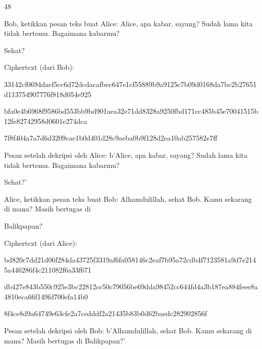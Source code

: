 \documentclass{article}
\begin{document}

48

Bob, ketikkan pesan teks buat Alice:  Alice, apa kabar, sayang? Sudah lama kita tidak bertemu. Bagaimana kabarmu? 

Sehat?

Ciphertext (dari Bob): 

33142cf0694daef5cc6d72dcdacafbec647e1cf55889b9a9125c7b09d0168da7bc2b27651d113754907776f818d054e925

bfa0e4b6968f9586bd553bb9bd901aea32e71dd8328a9250fbd171ec485b45e70041515b12fe82742958d0601e274dca

7f8f404a7a7d6d3209cae1b0d401d28c9aeba0b9f128d2ea10ab257582e7ff

Pesan setelah dekripsi oleh Alice: b'Alice, apa kabar, sayang? Sudah lama kita tidak bertemu. Bagaimana kabarmu? 

Sehat?'

Alice, ketikkan pesan teks buat Bob:  Alhamdulillah, sehat Bob. Kamu sekarang di mana? Masih bertugas di 

Balikpapan?

Ciphertext (dari Alice): 

bd820c7dd21d06f284da43725f3319af6fa058146c2eaf7b95a72cdb4f7123581a9d7e2145a446286f4c211082f6a33f671

db427e843b550c925e3bc22812cc50c79056be69dda98452cc644fd4a3b187ea884feee8a4810eca66f149fd700efa14b0

8f4ce8d9a64749e63cfe2a7cedddf2a21435b83b0d62baedc282902856f

Pesan setelah dekripsi oleh Bob: b'Alhamdulillah, sehat Bob. Kamu sekarang di mana? Masih bertugas di Balikpapan?'
\end{document}
